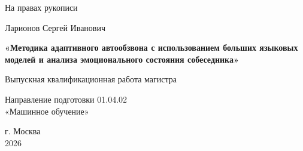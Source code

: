 \begin{titlepage}
\fontsize{12pt}{14pt}\selectfont
\singlespacing
{}

\vspace{0.95cm}


\vspace{0.95cm}


\vspace{0.95cm}


\vspace{0.9cm}

\begin{flushright}
На правах рукописи

\vspace{0.2cm}

\VkrUdkField
\end{flushright}

\vspace{0.9cm}

\begin{center}
Ларионов Сергей Иванович

\vspace{0.85cm}

\textbf{«Методика адаптивного автообзвона с использованием больших языковых моделей и анализа эмоционального состояния собеседника»}

\vspace{1.0cm}

Выпускная квалификационная работа магистра

\vspace{0.75cm}

Направление подготовки 01.04.02\\
«Машинное обучение»
\end{center}

\vfill

\begin{center}
г. Москва\\
2026
\end{center}
\end{titlepage}
